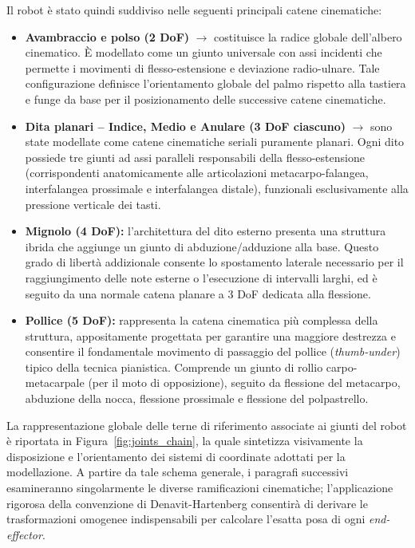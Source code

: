 \noindent
Il robot è stato quindi suddiviso nelle seguenti principali catene cinematiche:
\begin{itemize}[label=$\square$]
    \item \textbf{Avambraccio e polso (2 DoF)} $\to$ costituisce la radice globale dell'albero cinematico. 
    È modellato come un giunto universale con assi incidenti che permette i movimenti di flesso-estensione e deviazione radio-ulnare. 
    Tale configurazione definisce l'orientamento globale del palmo rispetto alla tastiera e funge da base per il posizionamento delle successive catene cinematiche.

    \item \textbf{Dita planari -- Indice, Medio e Anulare (3 DoF ciascuno)} $\to$ sono state modellate come catene cinematiche seriali puramente planari.
    Ogni dito possiede tre giunti ad assi paralleli responsabili della flesso-estensione (corrispondenti anatomicamente alle articolazioni metacarpo-falangea, interfalangea prossimale e interfalangea distale), funzionali esclusivamente alla pressione verticale dei tasti.

    \item \textbf{Mignolo (4 DoF):} l'architettura del dito esterno presenta una struttura ibrida che aggiunge un giunto di abduzione/adduzione alla base. 
    Questo grado di libertà addizionale consente lo spostamento laterale necessario per il raggiungimento delle note esterne o l'esecuzione di intervalli larghi, ed è seguito da una normale catena planare a 3 DoF dedicata alla flessione.
    
    \item \textbf{Pollice (5 DoF):} rappresenta la catena cinematica più complessa della struttura, appositamente progettata per garantire una maggiore destrezza e consentire il fondamentale movimento di passaggio del pollice (\textit{thumb-under}) tipico della tecnica pianistica. 
    Comprende un giunto di rollio carpo-metacarpale (per il moto di opposizione), seguito da flessione del metacarpo, abduzione della nocca, flessione prossimale e flessione del polpastrello.
\end{itemize}
La rappresentazione globale delle terne di riferimento associate ai giunti del robot è riportata in Figura~\ref{fig:joints_chain}, la quale sintetizza visivamente la disposizione e l'orientamento dei sistemi di coordinate adottati per la modellazione. 
A partire da tale schema generale, i paragrafi successivi esamineranno singolarmente le diverse ramificazioni cinematiche; l'applicazione rigorosa della convenzione di Denavit-Hartenberg consentirà di derivare le trasformazioni omogenee indispensabili per calcolare l'esatta posa di ogni \textit{end-effector}.

